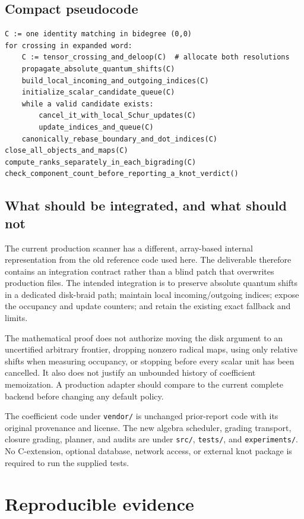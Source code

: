 \documentclass[11pt,letterpaper]{article}
\theoremstyle{remark}\newtheorem{remark}[theorem]{Remark}
\begin{document}
\subsection{Compact pseudocode}
\begin{lstlisting}
C := one identity matching in bidegree (0,0)
for crossing in expanded word:
    C := tensor_crossing_and_deloop(C)  # allocate both resolutions
    propagate_absolute_quantum_shifts(C)
    build_local_incoming_and_outgoing_indices(C)
    initialize_scalar_candidate_queue(C)
    while a valid candidate exists:
        cancel_it_with_local_Schur_updates(C)
        update_indices_and_queue(C)
    canonically_rebase_boundary_and_dot_indices(C)
close_all_objects_and_maps(C)
compute_ranks_separately_in_each_bigrading(C)
check_component_count_before_reporting_a_knot_verdict()
\end{lstlisting}

\subsection{What should be integrated, and what should not}
The current production scanner has a different, array-based internal representation from the old reference code used here. The deliverable therefore contains an integration contract rather than a blind patch that overwrites production files. The intended integration is to preserve absolute quantum shifts in a dedicated disk-braid path; maintain local incoming/outgoing indices; expose the occupancy and update counters; and retain the existing exact fallback and limits.

The mathematical proof does not authorize moving the disk argument to an uncertified arbitrary frontier, dropping nonzero radical maps, using only relative shifts when measuring occupancy, or stopping before every scalar unit has been cancelled. It also does not justify an unbounded history of coefficient memoization. A production adapter should compare to the current complete backend before changing any default policy.

The coefficient code under \texttt{vendor/} is unchanged prior-report code with its original provenance and license. The new algebra scheduler, grading transport, closure grading, planner, and audits are under \texttt{src/}, \texttt{tests/}, and \texttt{experiments/}. No C-extension, optional database, network access, or external knot package is required to run the supplied tests.

\section{Reproducible evidence}\label{sec:evidence}
\end{document}
